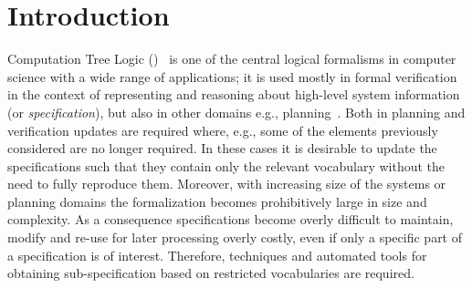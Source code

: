 \documentclass[letterpaper]{article}
\begin{document}
\section{Introduction}
Computation Tree Logic (\CTL)~\cite{clarke1981design} is one of the central logical formalisms in computer science with a wide range of applications; it is used mostly in formal verification in the context of representing and reasoning about high-level system information (or \emph{specification}), but also in other domains e.g., planning~\cite{giunchiglia1999planning,dal2002planning,akintunde2017planning}.
Both in planning and verification updates are required where, e.g., some of the elements previously considered are no longer required. In these cases it is desirable to update the specifications such that they contain only the relevant vocabulary without the need to fully reproduce them. Moreover, with increasing size of the systems or planning domains the formalization becomes prohibitively large in size and complexity. As a consequence specifications become overly difficult to maintain, modify and re-use for later processing overly costly, even if only a specific part of a specification is of interest. Therefore, techniques and automated tools for obtaining sub-specification based on restricted vocabularies are required.
\end{document}
